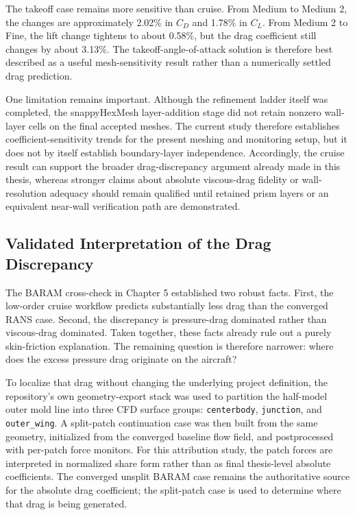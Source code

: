 \documentclass[12pt]{report}
\begin{document}
The takeoff case remains more sensitive than cruise. From Medium to Medium 2, the changes are approximately 2.02\% in \(C_D\) and 1.78\% in \(C_L\). From Medium 2 to Fine, the lift change tightens to about 0.58\%, but the drag coefficient still changes by about 3.13\%. The takeoff-angle-of-attack solution is therefore best described as a useful mesh-sensitivity result rather than a numerically settled drag prediction.

One limitation remains important. Although the refinement ladder itself was completed, the snappyHexMesh layer-addition stage did not retain nonzero wall-layer cells on the final accepted meshes. The current study therefore establishes coefficient-sensitivity trends for the present meshing and monitoring setup, but it does not by itself establish boundary-layer independence. Accordingly, the cruise result can support the broader drag-discrepancy argument already made in this thesis, whereas stronger claims about absolute viscous-drag fidelity or wall-resolution adequacy should remain qualified until retained prism layers or an equivalent near-wall verification path are demonstrated.

\subsection{Validated Interpretation of the Drag Discrepancy}
The BARAM cross-check in Chapter 5 established two robust facts. First, the low-order cruise workflow predicts substantially less drag than the converged RANS case. Second, the discrepancy is pressure-drag dominated rather than viscous-drag dominated. Taken together, these facts already rule out a purely skin-friction explanation. The remaining question is therefore narrower: where does the excess pressure drag originate on the aircraft?

To localize that drag without changing the underlying project definition, the repository's own geometry-export stack was used to partition the half-model outer mold line into three CFD surface groups: \texttt{centerbody}, \texttt{junction}, and \texttt{outer\_wing}. A split-patch continuation case was then built from the same geometry, initialized from the converged baseline flow field, and postprocessed with per-patch force monitors. For this attribution study, the patch forces are interpreted in normalized share form rather than as final thesis-level absolute coefficients. The converged unsplit BARAM case remains the authoritative source for the absolute drag coefficient; the split-patch case is used to determine where that drag is being generated.
\end{document}
